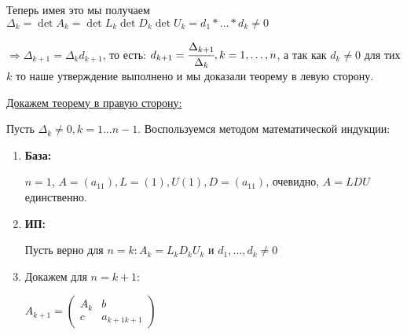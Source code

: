    Теперь имея это мы получаем $\Delta_k = \det A_k = \det L_k \det D_k \det U_k = d_1 * \ldots * d_k \neq 0$

    $\Rightarrow \Delta_{k+1} = \Delta_k d_{k+1}$, то есть: $d_{k+1} = \cfrac{\Delta_{k+1}}{\Delta_k}, k = 1,\ldots, n$, а так как $d_k\neq 0 $ для 
    тих $k$ то наше утверждение выполнено и мы доказали теорему в левую сторону.

    \uline{Докажем теорему в правую сторону:}

    Пусть $\Delta_k \neq 0, k = 1\ldots n-1$. Воспользуемся методом математической индукции:
    \begin{enumerate}
        \item[] \textbf{База:}
        
        $n=1$, $A = (a_{11}), L= (1), U(1) , D = (a_{11})$, очевидно, $A = LDU$ единственно.
        \item[] \textbf{ИП:}

        Пусть верно для $n =k: A_k  =L_k D_k U_k$ и $d_1,\ldots, d_k \neq 0$

        \item[] Докажем для $n = k+1$:

        $A_{k+1} = \begin{pmatrix}
            A_k & b \\
            c & a_{k+1 k+1}
        \end{pmatrix}$


\end{enumerate}
